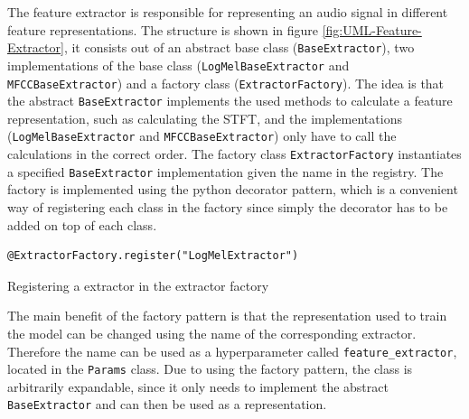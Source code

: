 \noindent
The feature extractor is responsible for representing an audio signal in different feature representations. The structure is shown in figure \ref{fig:UML-Feature-Extractor}, it consists out of an abstract base class (\texttt{BaseExtractor}), two implementations of the base class (\texttt{LogMelBaseExtractor} and \texttt{MFCCBaseExtractor}) and a factory class (\texttt{ExtractorFactory}). The idea is that the abstract \texttt{BaseExtractor} implements the used methods to calculate a feature representation, such as calculating the \gls{STFT}, and the implementations (\texttt{LogMelBaseExtractor} and \texttt{MFCCBaseExtractor}) only have to call the calculations in the correct order. The factory class \texttt{ExtractorFactory} instantiates a specified \texttt{BaseExtractor} implementation given the name in the registry. The factory is implemented using the python decorator pattern, which is a convenient way of registering each class in the factory since simply the decorator has to be added on top of each class.

\begin{code}[htbp]
\begin{verbatim}
@ExtractorFactory.register("LogMelExtractor")
\end{verbatim}
\caption{Registering a extractor in the extractor factory}
\label{code:Extractor-Factory}
\end{code}
\noindent
The main benefit of the factory pattern is that the representation used to train the model can be changed using the name of the corresponding extractor. Therefore the name can be used as a hyperparameter called \texttt{feature\_extractor}, located in the \texttt{Params} class. Due to using the factory pattern, the class is arbitrarily expandable, since it only needs to implement the abstract \texttt{BaseExtractor} and can then be used as a representation.

